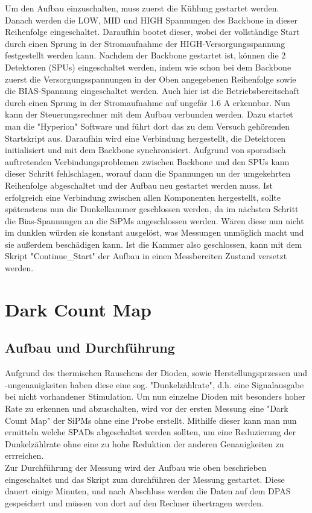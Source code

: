 \documentclass[12pt,twoside,a4paper]{scrartcl}
\begin{document}
	Um den Aufbau einzuschalten, muss zuerst die Kühlung gestartet werden. Danach werden die LOW, MID und HIGH Spannungen des Backbone in dieser Reihenfolge eingeschaltet. Daraufhin bootet dieser, wobei der vollständige Start durch einen Sprung in der Stromaufnahme der HIGH-Versorgungsspannung festgestellt werden kann. Nachdem der Backbone gestartet ist, können die 2 Detektoren (SPUs) eingeschaltet werden, indem wie schon bei dem Backbone zuerst die Versorgungsspannungen in der Oben angegebenen Reihenfolge sowie die BIAS-Spannung eingeschaltet werden. Auch hier ist die Betriebsbereitschaft durch einen Sprung in der Stromaufnahme auf ungefär 1.6 A erkennbar. Nun kann der Steuerungsrechner mit dem Aufbau verbunden werden. Dazu startet man die "Hyperion" Software und führt dort das zu dem Versuch gehörenden Startskript aus. Daraufhin wird eine Verbindung hergestellt, die Detektoren initialisiert und mit dem Backbone synchronisiert. Aufgrund von sporadisch auftretenden Verbindungsproblemen zwischen Backbone und den SPUs kann dieser Schritt fehlschlagen, worauf dann die Spannungen un der umgekehrten Reihenfolge abgeschaltet und der Aufbau neu gestartet werden muss.
	Ist erfolgreich eine Verbindung zwischen allen Komponenten hergestellt, sollte spätenstens nun die Dunkelkammer geschlossen werden, da im nächsten Schritt die Bias-Spannungen an die SiPMs angeschlossen werden. Wären diese nun nicht im dunklen würden sie konstant ausgelöst, was Messungen unmöglich macht und sie außerdem beschädigen kann. Ist die Kammer also geschlossen, kann mit dem Skript "Continue\_Start" der Aufbau in einen Messbereiten Zustand versetzt werden.

	\section{Dark Count Map}

		\subsection{Aufbau und Durchführung}

			Aufgrund des thermischen Rauschens der Dioden, sowie Herstellungsprzessen und -ungenauigkeiten haben diese eine sog. "Dunkelzählrate", d.h. eine Signalausgabe bei nicht vorhandener Stimulation. Um nun einzelne Dioden mit besonders hoher Rate zu erkennen und abzuschalten, wird vor der ersten Messung eine "Dark Count Map" der SiPMs ohne eine Probe erstellt. Mithilfe dieser kann man nun ermitteln welche SPADs abgeschaltet werden sollten, um eine Reduzierung der Dunkelzählrate ohne eine zu hohe Reduktion der anderen Genauigkeiten zu errreichen.\\
			Zur Durchführung der Messung wird der Aufbau wie oben beschrieben eingeschaltet und das Skript zum durchführen der Messung gestartet. Diese dauert einige Minuten, und nach Abschluss werden die Daten auf dem DPAS gespeichert und müssen von dort auf den Rechner übertragen werden.
\end{document}
